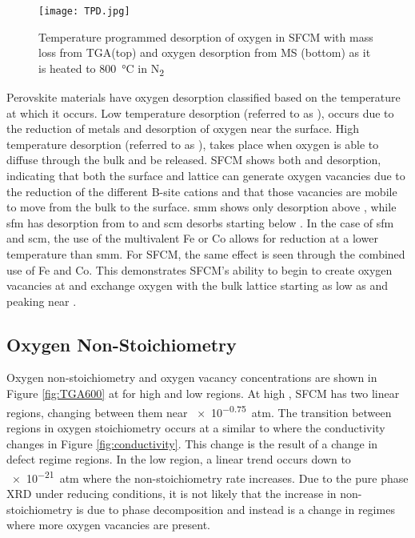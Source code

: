     \begin{figure}[p]
      \texttt{[image: TPD.jpg]}
      \caption{Temperature programmed desorption of oxygen in SFCM with mass loss from TGA(top) and oxygen desorption from MS (bottom) as it is heated to \SI{800}{\celsius} in N\textsubscript{2}}
      \label{fig:TPD}
    \end{figure}

    Perovskite materials have oxygen desorption classified based on the temperature at which it occurs.
    Low temperature desorption (referred to as \textalpha{}), occurs due to the reduction of metals and desorption of oxygen near the surface.
    High temperature desorption (referred to as \textbeta{}), takes place when oxygen is able to diffuse through the bulk and be released.\cite{Levasseur2009}
    SFCM shows both \textalpha{} and \textbeta{} desorption, indicating that both the surface and lattice can generate oxygen vacancies due to the reduction of the different B-site cations and that those vacancies are mobile to move from the bulk to the surface.
    \gls{smm} shows only \textbeta{} desorption above , while \gls{sfm} has \textalpha{} desorption from  to  and \gls{scm} desorbs starting below .\cite{Liu2011, Vasala2010}
    In the case of \gls{sfm} and \gls{scm}, the use of the multivalent Fe or Co allows for reduction at a lower temperature than \gls{smm}.
    For SFCM, the same effect is seen through the combined use of Fe and Co.
    This demonstrates SFCM's ability to begin to create oxygen vacancies at  and exchange oxygen with the bulk lattice starting as low as  and peaking near .

    \subsection{Oxygen Non-Stoichiometry}
    Oxygen non-stoichiometry and oxygen vacancy concentrations are shown in Figure \ref{fig:TGA600} at  for high and low  regions.
    At high , SFCM has two linear regions, changing between them near \SI{e-0.75}{atm}.
    The transition between regions in oxygen stoichiometry occurs at a similar  to where the conductivity changes in Figure \ref{fig:conductivity}.
    This change is the result of a change in defect regime regions.
    In the low  region, a linear trend occurs down to \SI{e-21}{atm} where the non-stoichiometry rate increases.
    Due to the pure phase XRD under reducing conditions, it is not likely that the increase in non-stoichiometry is due to phase decomposition and instead is a change in regimes where more oxygen vacancies are present.


